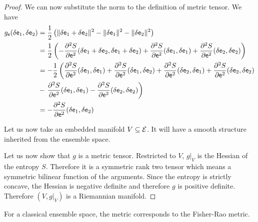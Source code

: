 \begin{proof}
We can now substitute the norm to the definition of metric tensor. We have
\begin{equation}
	\begin{aligned}
		g_{\mathsf{e}}(\delta \mathsf{e}_1, \delta \mathsf{e}_2 ) &= \frac{1}{2} \left( \lVert \delta \mathsf{e}_1 + \delta \mathsf{e}_2 \rVert^2 - \lVert \delta \mathsf{e}_1 \rVert^2 - \lVert \delta \mathsf{e}_2 \rVert^2 \right) \\
		&= \frac{1}{2} \left( - \frac{\partial^2 S}{\partial \mathsf{e}^2} (\delta \mathsf{e}_1 + \delta \mathsf{e}_2, \delta \mathsf{e}_1 + \delta \mathsf{e}_2) + \frac{\partial^2 S}{\partial \mathsf{e}^2} (\delta \mathsf{e}_1, \delta \mathsf{e}_1) + \frac{\partial^2 S}{\partial \mathsf{e}^2} (\delta \mathsf{e}_2, \delta \mathsf{e}_2) \right) \\
		&= - \frac{1}{2} \left(  \frac{\partial^2 S}{\partial \mathsf{e}^2} (\delta \mathsf{e}_1, \delta \mathsf{e}_1) + \frac{\partial^2 S}{\partial \mathsf{e}^2} (\delta \mathsf{e}_1, \delta \mathsf{e}_2) + \frac{\partial^2 S}{\partial \mathsf{e}^2} (\delta \mathsf{e}_2, \delta \mathsf{e}_1) + \frac{\partial^2 S}{\partial \mathsf{e}^2} (\delta \mathsf{e}_2, \delta \mathsf{e}_2) \right. \\
		&-  \left. \frac{\partial^2 S}{\partial \mathsf{e}^2} (\delta \mathsf{e}_1, \delta \mathsf{e}_1) - \frac{\partial^2 S}{\partial \mathsf{e}^2} (\delta \mathsf{e}_2, \delta \mathsf{e}_2) \right) \\
		&= - \frac{\partial^2 S}{\partial \mathsf{e}^2} (\delta \mathsf{e}_1, \delta \mathsf{e}_2) \\
	\end{aligned}
\end{equation}

	Let us now take an embedded manifold $V \subseteq \mathcal{E}$. It will have a smooth structure inherited from the ensemble space.
	
	Let us now show that $g$ is a metric tensor. Restricted to $V$, $g|_V$ is the Hessian of the entropy $S$. Therefore it is a symmetric rank two tensor which means a symmetric bilinear function of the arguments. Since the entropy is strictly concave, the Hessian is negative definite and therefore $g$ is positive definite. Therefore $(V, g|_V)$ is a Riemannian manifold.
\end{proof}

\begin{prop}
	For a classical ensemble space, the metric corresponds to the Fisher-Rao metric.
\end{prop}

